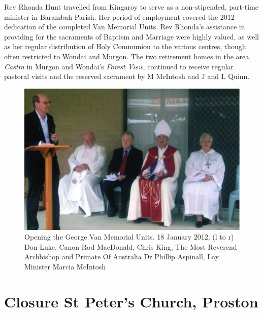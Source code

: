 Rev Rhonda Hunt travelled from Kingaroy to serve as a non-stipended, part-time minister in Barambah Parish. Her period of employment covered the 2012 dedication of the completed Van Memorial Units. Rev Rhonda's assistance in providing for the sacraments of Baptism and Marriage were highly valued, as well as her regular distribution of Holy Communion to the various centres, though often restricted to Wondai and Murgon. The two retirement homes in the area, \emph{Castra} in Murgon and Wondai's \emph{Forest View}, continued to receive regular pastoral visits and the reserved sacrament by M McIntosh and J and L Quinn.









\begin{figure}[!htb]
\begin{center}
\includegraphics[width=1.\textwidth,center]{../images/openingGeorgeVannMemorialUnits.jpg}
\caption{Opening the George Van Memorial Units. 18 January 2012, (l to r) Don Luke, Canon Rod MacDonald, Chris King, The Most Reverend Archbishop and Primate Of Australia Dr Phillip Aspinall, Lay Minister Marcia McIntosh}
\end{center}
\end{figure}




\section{Closure St Peter's Church, Proston}



